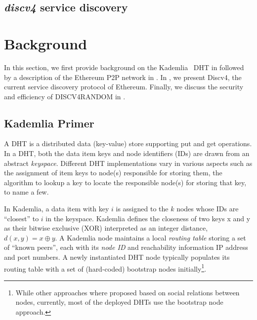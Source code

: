 
\subsection{\emph{discv4} service discovery}
\label{sec:background:discv4}




\section{Background}
\label{sec:background}

In this section, we first provide background on the Kademlia~\cite{maymounkov2002kademlia} DHT in  followed by a description of the Ethereum P2P network in .  In , we present Discv4, the current service discovery protocol of Ethereum. Finally, we discuss the security and efficiency of DISCV4RANDOM in . 

\subsection{Kademlia Primer}
\label{sec:kademlia}

 A DHT is a distributed data (\ie key-value) store supporting put and get operations. In a DHT,
 both the data item keys and node identifiers (\ie IDs) are drawn from an abstract \textit{keyspace}. Different DHT implementations vary in various aspects such as the assignment of item keys to node(s) responsible for storing them, the algorithm to lookup a key to locate the responsible node(s) for storing that key, to name a few.

 In Kademlia, a data item with key $i$ is assigned to the $k$ nodes whose IDs are ``closest'' to $i$ in the keyspace. Kademlia defines the closeness of two keys x and y as their bitwise exclusive (XOR) interpreted as an integer distance, \ie $d(x,y) = x \oplus y$. A Kademlia node maintains a local \textit{routing table} storing a set of ``known peers'', each with its \textit{node ID} and reachability information \ie IP address and port numbers. A newly instantiated DHT node typically populates its routing table with a set of (hard-coded) bootstrap nodes initially\footnote{While other approaches where proposed based on social relations between nodes, currently, most of the deployed DHTs use the bootstrap node approach.}. 

